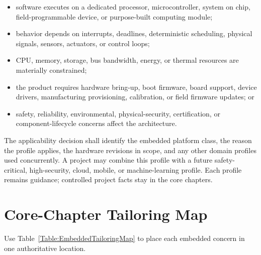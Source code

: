 \begin{itemize}
\item software executes on a dedicated processor, microcontroller, system on
chip, field-programmable device, or purpose-built computing module;
\item behavior depends on interrupts, deadlines, deterministic scheduling,
physical signals, sensors, actuators, or control loops;
\item CPU, memory, storage, bus bandwidth, energy, or thermal resources are
materially constrained;
\item the product requires hardware bring-up, boot firmware, board support,
device drivers, manufacturing provisioning, calibration, or field firmware
updates; or
\item safety, reliability, environmental, physical-security, certification,
or component-lifecycle concerns affect the architecture.
\end{itemize}

The applicability decision shall identify the embedded platform class, the
reason the profile applies, the hardware revisions in scope, and any other
domain profiles used concurrently. A project may combine this profile with a
future safety-critical, high-security, cloud, mobile, or machine-learning
profile. Each profile remains guidance; controlled project facts stay in the
core chapters.

\section{Core-Chapter Tailoring Map}
Use Table~\ref{Table:EmbeddedTailoringMap} to place each embedded concern in
one authoritative location.


